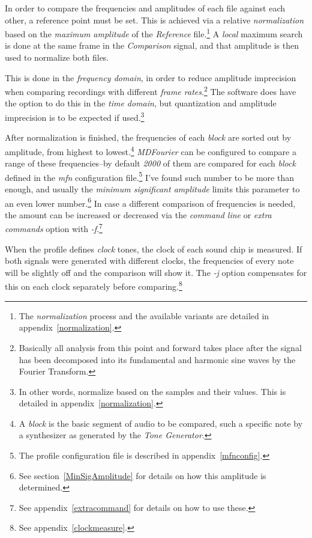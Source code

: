 \documentclass[10pt,a4paper]{report}
\begin{document}
In order to compare the frequencies and amplitudes of each file against each other, a reference point must be set. This is achieved via a relative \textit{normalization} based on the \textit{maximum amplitude} of the \textit{Reference} file.\footnote{The \textit{normalization} process and the available variants are detailed in appendix~\ref{normalization}.} A \textit{local} maximum search is done at the same frame in the \textit{Comparison} signal, and that amplitude is then used to normalize both files. 

This is done in the \textit{frequency domain}, in order to reduce amplitude imprecision when comparing recordings with different \textit{frame rates}.\footnote{Basically all analysis from this point and forward takes place after the signal has been decomposed into its fundamental and harmonic sine waves by the Fourier Transform.} The software does have the option to do this in the \textit{time domain}, but quantization and amplitude imprecision is to be expected if used.\footnote{In other words, normalize based on the samples and their values. This is detailed in appendix~\ref{normalization}.}

After normalization is finished, the frequencies of each \textit{block} are sorted out by amplitude, from highest to lowest.\footnote{A \textit{block} is the basic segment of audio to be compared, such a specific note by a synthesizer as generated by the \textit{Tone Generator}.} \textit{MDFourier} can be configured to compare a range of these frequencies--by default \textit{2000} of them are compared for each \textit{block} defined in the \textit{mfn} configuration file.\footnote{The profile configuration file is described in appendix~\ref{mfnconfig}.} I've found such number to be more than enough, and usually the \textit{minimum significant amplitude} limits this parameter to an even lower number.\footnote{See section~\ref{MinSigAmplitude} for details on how this amplitude is determined.} In case a different comparison of frequencies is needed, the amount can be increased or decreased via the \textit{command line} or \textit{extra commands} option with \textit{-f}.\footnote{See appendix~\ref{extracommand} for details on how to use these.}

When the profile defines \textit{clock} tones, the clock of each sound chip is measured. If both signals were generated with different clocks, the frequencies of every note will be slightly off and the comparison will show it. The \textit{-j} option compensates for this on each clock separately before comparing.\footnote{See appendix~\ref{clockmeasure}.}
\end{document}
